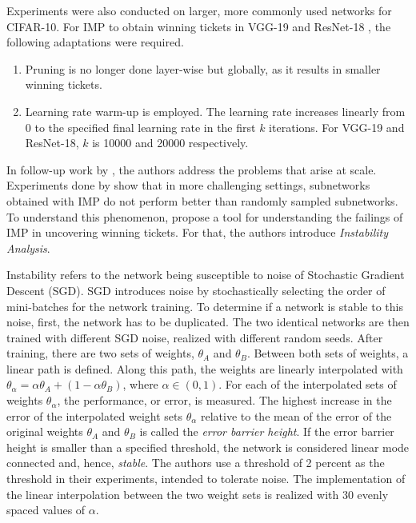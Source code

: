 Experiments were also conducted on larger, more commonly used networks for CIFAR-10. For {IMP} to obtain winning tickets in VGG-19 \autocite{Liu19} and ResNet-18 \autocite{ResidualConnect}, the following adaptations were required. 
\begin{enumerate}
  \item Pruning is no longer done layer-wise but globally, as it results in smaller winning tickets. 
  \item Learning rate warm-up is employed. The learning rate increases linearly from 0 to the specified final learning rate in the first $k$ iterations. For VGG-19 and ResNet-18, $k$ is 10000 and 20000 respectively.
\end{enumerate}
In follow-up work by \textcite{LinearModeConnectivity}, the authors address the problems that arise at scale.
Experiments done by \textcite{Liu19, Gale19} show that in more challenging settings, subnetworks obtained with {IMP} do not perform better than randomly sampled subnetworks.
To understand this phenomenon, \textcite{LinearModeConnectivity} propose a tool for understanding the failings of {IMP} in uncovering winning tickets.
For that, the authors introduce \textit{Instability Analysis}.

Instability refers to the network being susceptible to noise of Stochastic Gradient Descent (SGD).
SGD introduces noise by stochastically selecting the order of mini-batches for the network training.
To determine if a network is stable to this noise, first, the network has to be duplicated.
The two identical networks are then trained with different SGD noise, realized with different random seeds.
After training, there are two sets of weights, $\theta_A$ and $\theta_B$.
Between both sets of weights, a linear path is defined.
Along this path, the weights are linearly interpolated with $\theta_\alpha = \alpha \theta_A + (1 - \alpha \theta_B)$, where $\alpha \in (0,1)$. 
For each of the interpolated sets of weights $\theta_\alpha$, the performance, or error, is measured.
The highest increase in the error of the interpolated weight sets $\theta_\alpha$ relative to the mean of the error of the original weights $\theta_A$ and $\theta_B$ is called the \textit{error barrier height}. 
If the error barrier height is smaller than a specified threshold, the network is considered linear mode connected and, hence, \textit{stable}.
The authors use a threshold of 2 percent as the threshold in their experiments, intended to tolerate noise. 
The implementation of the linear interpolation between the two weight sets is realized with 30 evenly spaced values of $\alpha$.

